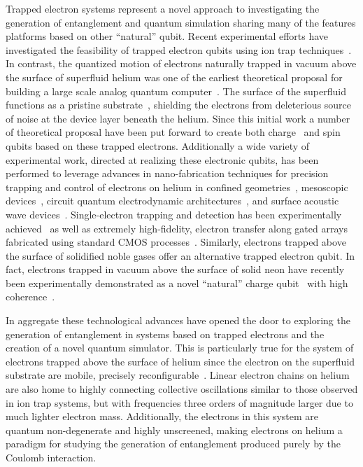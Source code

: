 \documentclass[twocolumn,superscriptaddress,unsortedaddress,
 amsmath,amssymb,
 aps,
]{revtex4-2}
\begin{document}
Trapped electron systems represent a novel approach to investigating the generation of entanglement and  quantum simulation sharing many of the features platforms based on other ``natural'' qubit. Recent experimental efforts have investigated the feasibility of trapped electron qubits using ion trap techniques~\cite{Matthiesen2019,Yu2022}. In contrast, the quantized motion of electrons naturally trapped in vacuum above the surface of superfluid helium was one of the earliest theoretical proposal for building a large scale analog quantum computer~\cite{platzman1999quantum}. The surface of the superfluid functions as a pristine substrate~\cite{Shirahama1995}, shielding the electrons from deleterious source of noise at the device layer beneath the helium. Since this initial work a number of theoretical proposal have been put forward to create both charge~\cite{dykman2003qubits,Dahm2003,Schuster2010,Shi2014,Kawakami2023} and spin~\cite{Lyon2006,Schuster2010,Dykman2023,Kawakami2023} qubits based on these trapped electrons. Additionally a wide variety of experimental work, directed at realizing these electronic qubits, has been performed to leverage advances in nano-fabrication techniques for precision trapping and control of electrons on helium in confined geometries~\cite{Marty1986,Ikegami2009,Rees2016a,Rees2016b,Zou2022}, mesoscopic devices~\cite{Papageorgiou2004,Rees2011,Rees2012}, circuit quantum electrodynamic architectures~\cite{Yang2016,koolstra2019coupling}, and surface acoustic wave devices~\cite{Byeon2021}. Single-electron trapping and detection has been experimentally achieved~\cite{Papageorgiou2004,Rousseau2007,koolstra2019coupling} as well as extremely high-fidelity, electron transfer along gated arrays fabricated using standard CMOS processes~\cite{Bradbury2011}. Similarly, electrons trapped above the surface of solidified noble gases offer an alternative trapped electron qubit. In fact, electrons trapped in vacuum above the surface of solid neon have recently been experimentally demonstrated as a novel ``natural'' charge qubit~\cite{} with high coherence~\cite{}. 

In aggregate these technological advances have opened the door to exploring the generation of entanglement in systems based on trapped electrons and the creation of a novel quantum simulator. This is particularly true for the system of electrons trapped above the surface of helium since the electron on the superfluid substrate are mobile,  precisely reconfigurable~\cite{}. Linear electron chains on helium are also home to highly connecting collective oscillations similar to those observed in ion trap systems, but with frequencies three orders of magnitude larger due to much lighter electron mass. Additionally, the electrons in this system are quantum non-degenerate and highly unscreened, making electrons on helium a paradigm for studying the generation of entanglement produced purely by the Coulomb interaction.
\end{document}
